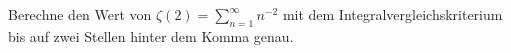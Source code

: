 \begin{prob}
Berechne den Wert von $\zeta(2)=\sum_{n=1}^\infty n^{-2}$ mit dem
Integralvergleichskriterium bis auf zwei Stellen hinter dem Komma genau.
\end{prob}
